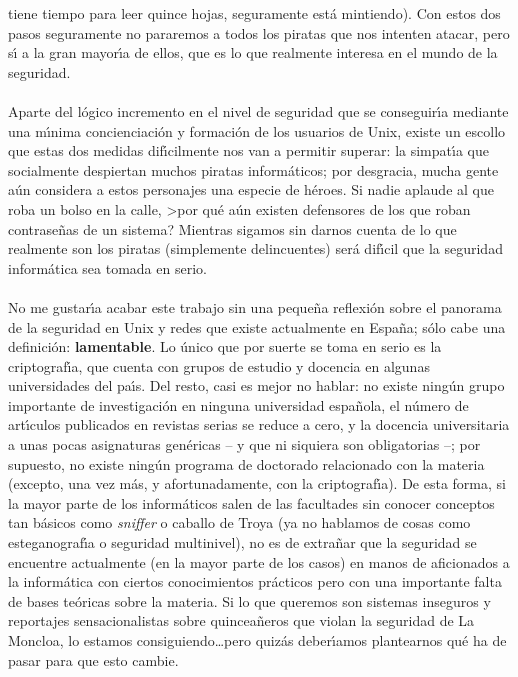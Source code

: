 tiene tiempo para leer quince hojas, seguramente est\'a mintiendo). Con estos
dos pasos seguramente no pararemos a todos los piratas que nos intenten atacar,
pero s\'{\i} a la gran mayor\'{\i}a de ellos, que es lo que realmente interesa 
en el mundo de la seguridad.\\
\\Aparte del l\'ogico incremento en el nivel de seguridad que se 
conseguir\'{\i}a mediante una m\'{\i}nima concienciaci\'on y formaci\'on de los 
usuarios de Unix, existe un escollo que estas dos medidas dif\'{\i}cilmente nos
van a permitir superar: la simpat\'{\i}a que socialmente despiertan muchos 
piratas inform\'aticos; por desgracia, mucha gente a\'un considera a estos 
personajes una especie de h\'eroes. Si nadie aplaude al que roba un bolso 
en la calle, >por qu\'e a\'un existen defensores de los que roban contrase\~nas 
de un sistema? Mientras sigamos sin darnos cuenta de lo que realmente son los 
piratas (simplemente delincuentes) ser\'a dif\'{\i}cil que la seguridad 
inform\'atica sea tomada en serio.\\
\\No me gustar\'{\i}a acabar este trabajo sin una peque\~na reflexi\'on sobre
el panorama de la seguridad en Unix y redes que existe actualmente en Espa\~na;
s\'olo cabe una definici\'on: {\bf lamentable}. Lo \'unico que por suerte se 
toma en serio es la criptograf\'{\i}a, que cuenta con grupos de estudio y 
docencia en algunas universidades del pa\'{\i}s. Del resto, casi es mejor no 
hablar: no existe ning\'un grupo importante de investigaci\'on en ninguna 
universidad espa\~nola, el n\'umero de art\'{\i}culos pu\-bli\-ca\-dos en 
revistas
serias se reduce a cero, y la docencia universitaria a unas pocas asignaturas
gen\'ericas -- y que ni siquiera son obligatorias --; por supuesto, no existe
ning\'un programa de doctorado relacionado con la materia (excepto, una vez 
m\'as, y afortunadamente, con la criptograf\'{\i}a). De esta forma, si la mayor
parte de los inform\'aticos salen de las facultades sin conocer conceptos tan
b\'asicos como {\it sniffer} o caballo de Troya (ya no hablamos de cosas como 
esteganograf\'{\i}a o seguridad multinivel), no es de extra\~nar que la 
seguridad se encuentre actualmente (en la mayor parte de los casos) en manos de 
aficionados a la inform\'atica
con ciertos conocimientos pr\'acticos pero con una importante falta de bases 
te\'oricas sobre la materia. Si lo que queremos son sistemas inseguros y 
reportajes sensacionalistas sobre quincea\~neros que violan la seguridad de La
Moncloa, lo estamos consiguiendo\ldots pero quiz\'as deber\'{\i}amos 
plantearnos qu\'e ha de pasar para que esto cambie.
\vspace{1cm}\\
